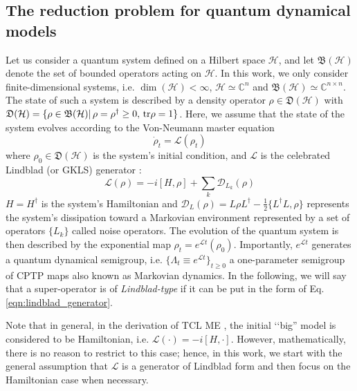 \documentclass[twocolumn]{autart}    %
\newcommand{\Dc}{\mathcal{D}}
\newcommand{\Hc}{\mathcal{H}}
\newcommand{\Lc}{\mathcal{L}}
\newcommand{\Cb}{\mathbb{C}}
\newcommand{\Bf}{\mathfrak{B}}
\newcommand{\Df}{\mathfrak{D}}
\newcommand{\um}{\frac{1}{2}}
\newcommand{\tr}{{\rm tr}}
\begin{document}
\subsection{The reduction problem for quantum dynamical models}
\label{sec:quantum_connection}
Let us consider a quantum system defined on a Hilbert space $\Hc$, and let $\Bf(\Hc)$ denote the set of bounded operators acting on $\Hc$. In this work, we only consider finite-dimensional systems, i.e. $\dim(\Hc)<\infty$, $\Hc\simeq\Cb^n$ and $\Bf(\Hc)\simeq \Cb^{n\times n}.$
The state of such a system is described by a density operator $\rho\in\Df(\Hc)$ with $\Df(\Hc) = \{\rho\in\Bf(\Hc)|\, \rho=\rho^\dag\geq0,\,\tr\rho=1\}$. Here, we assume that the state of the system evolves according to the Von-Neumann master equation 
\begin{equation}
    \dot{\rho}_t = \Lc(\rho_t)
    \label{eq:original_model}
\end{equation}
where $\rho_0\in\Df(\Hc)$ is the system's initial condition, and $\Lc$ is the celebrated Lindblad (or GKLS) generator \cite{lindblad1976generators,Gorini:1975nb}: 
\begin{equation}
    \Lc(\rho) = -i[H,\rho] + \sum_k\Dc_{L_k}(\rho)
    \label{eqn:lindblad_generator}
\end{equation}
$H=H^\dag$ is the system's Hamiltonian and $\Dc_L(\rho) = L\rho L^\dag - \um\{L^\dag L, \rho\}$ represents the system's dissipation toward a Markovian environment represented by a set of operators $\{L_k\}$ called noise operators. The evolution of the quantum system is then described by the exponential map $\rho_t = e^{\Lc t}(\rho_0)$. Importantly, $e^{\Lc t}$ generates a quantum dynamical semigroup, i.e. $\{\Lambda_t \equiv e^{\Lc t}\}_{t\geq 0}$ a one-parameter semigroup of CPTP maps also known as Markovian dynamics.
In the following, we will say that a super-operator is of \textit{Lindblad-type} if it can be put in the form of Eq. \eqref{eqn:lindblad_generator}.

Note that in general, in the derivation of TCL ME \cite{shibata_generalized_1977,chaturvedi_time-convolutionless_1979}, the initial ‘‘big'' model is considered to be Hamiltonian, i.e. $\Lc(\cdot)=-i[H,\cdot]$. However, mathematically, there is no reason to restrict to this case; hence, in this work, we start with the general assumption that $\Lc$ is a generator of Lindblad form and then focus on the Hamiltonian case when necessary.
\end{document}
